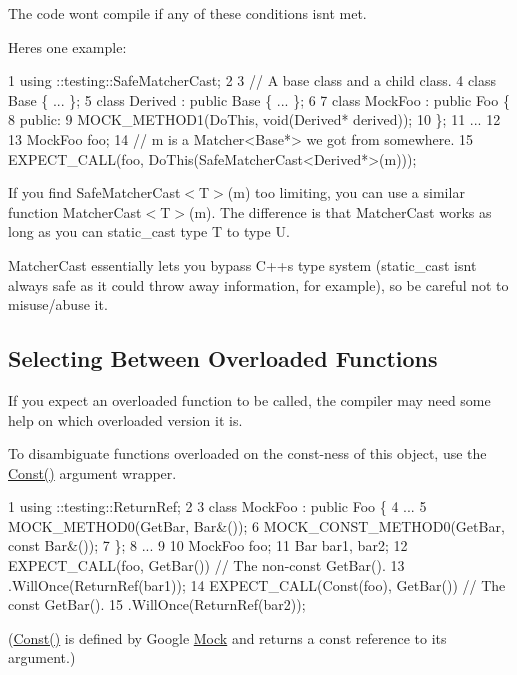 The code won\textquotesingle{}t compile if any of these conditions isn\textquotesingle{}t met.

Here\textquotesingle{}s one example\+:


\begin{DoxyCode}
1 using ::testing::SafeMatcherCast;
2 
3 // A base class and a child class.
4 class Base \{ ... \};
5 class Derived : public Base \{ ... \};
6 
7 class MockFoo : public Foo \{
8  public:
9   MOCK\_METHOD1(DoThis, void(Derived* derived));
10 \};
11 ...
12 
13   MockFoo foo;
14   // m is a Matcher<Base*> we got from somewhere.
15   EXPECT\_CALL(foo, DoThis(SafeMatcherCast<Derived*>(m)));
\end{DoxyCode}


If you find {\ttfamily Safe\+Matcher\+Cast$<$T$>$(m)} too limiting, you can use a similar function {\ttfamily Matcher\+Cast$<$T$>$(m)}. The difference is that {\ttfamily Matcher\+Cast} works as long as you can {\ttfamily static\+\_\+cast} type {\ttfamily T} to type {\ttfamily U}.

{\ttfamily Matcher\+Cast} essentially lets you bypass C++\textquotesingle{}s type system ({\ttfamily static\+\_\+cast} isn\textquotesingle{}t always safe as it could throw away information, for example), so be careful not to misuse/abuse it.

\subsection*{Selecting Between Overloaded Functions}

If you expect an overloaded function to be called, the compiler may need some help on which overloaded version it is.

To disambiguate functions overloaded on the const-\/ness of this object, use the {\ttfamily \hyperlink{namespacetesting_a945ac56c5508a3c9c032bbe8aae8dcfa}{Const()}} argument wrapper.


\begin{DoxyCode}
1 using ::testing::ReturnRef;
2 
3 class MockFoo : public Foo \{
4   ...
5   MOCK\_METHOD0(GetBar, Bar&());
6   MOCK\_CONST\_METHOD0(GetBar, const Bar&());
7 \};
8 ...
9 
10   MockFoo foo;
11   Bar bar1, bar2;
12   EXPECT\_CALL(foo, GetBar())         // The non-const GetBar().
13       .WillOnce(ReturnRef(bar1));
14   EXPECT\_CALL(Const(foo), GetBar())  // The const GetBar().
15       .WillOnce(ReturnRef(bar2));
\end{DoxyCode}


({\ttfamily \hyperlink{namespacetesting_a945ac56c5508a3c9c032bbe8aae8dcfa}{Const()}} is defined by Google \hyperlink{class_mock}{Mock} and returns a {\ttfamily const} reference to its argument.)

